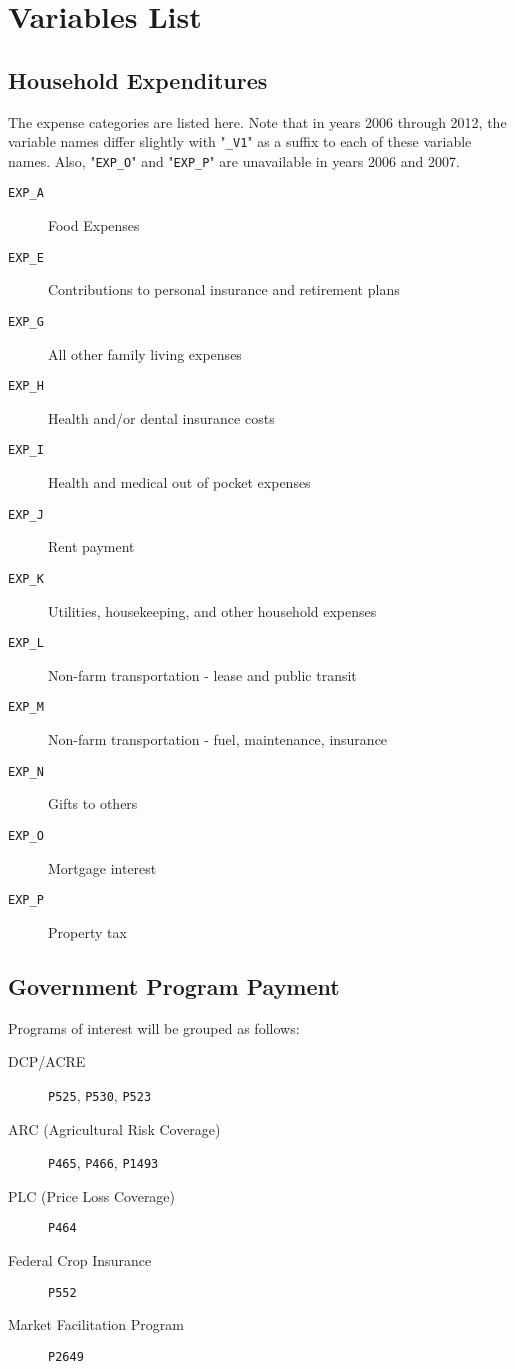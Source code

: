 \documentclass[11pt]{article}
\begin{document}
\section{Variables List}
\label{sec:org2cae32a}
\subsection{Household Expenditures}
\label{sec:org251c604}
The expense categories are listed here. Note that in years 2006 through 2012, the variable names differ slightly with "\texttt{\_V1}" as a suffix to each of these variable names. Also, "\texttt{EXP\_O}" and "\texttt{EXP\_P}" are unavailable in years 2006 and 2007.

\begin{description}
\item[{\texttt{EXP\_A}}] Food Expenses
\item[{\texttt{EXP\_E}}] Contributions to personal insurance and retirement plans
\item[{\texttt{EXP\_G}}] All other family living expenses
\item[{\texttt{EXP\_H}}] Health and/or dental insurance costs
\item[{\texttt{EXP\_I}}] Health and medical out of pocket expenses
\item[{\texttt{EXP\_J}}] Rent payment
\item[{\texttt{EXP\_K}}] Utilities, housekeeping, and other household expenses
\item[{\texttt{EXP\_L}}] Non-farm transportation - lease and public transit
\item[{\texttt{EXP\_M}}] Non-farm transportation - fuel, maintenance, insurance
\item[{\texttt{EXP\_N}}] Gifts to others
\item[{\texttt{EXP\_O}}] Mortgage interest
\item[{\texttt{EXP\_P}}] Property tax
\end{description}

\subsection{Government Program Payment}
\label{sec:org99bb475}
Programs of interest will be grouped as follows:
\begin{description}
\item[{DCP/ACRE}] \texttt{P525}, \texttt{P530}, \texttt{P523}
\item[{ARC (Agricultural Risk Coverage)}] \texttt{P465}, \texttt{P466}, \texttt{P1493}
\item[{PLC (Price Loss Coverage)}] \texttt{P464}
\item[{Federal Crop Insurance}] \texttt{P552}
\item[{Market Facilitation Program}] \texttt{P2649}
\end{description}
\end{document}
